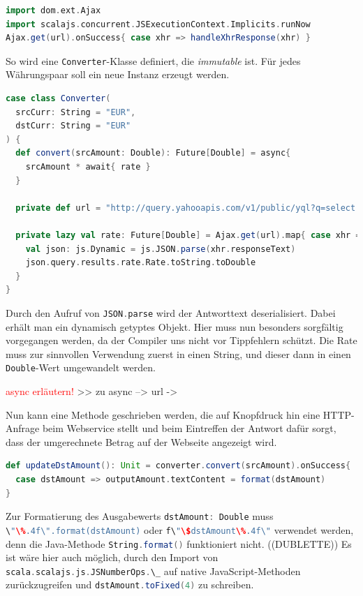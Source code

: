 \documentclass[a4paper, 12pt, hidelinks, listof=totoc, listoftables=totoc, bibliography=totoc]{scrreprt}
\newcommand{\scala}[1]{\lstinline[language=Scala, style=inline]|#1|}
\newcommand{\TODO}[1]{\textcolor{red}{#1}\newline}
\begin{document}
\begin{lstlisting}[language=Scala, caption={Futures-basierter HTTP-Aufruf mit Scala.js-Bequemlichkeitsmethode.}]
import dom.ext.Ajax
import scalajs.concurrent.JSExecutionContext.Implicits.runNow
Ajax.get(url).onSuccess{ case xhr => handleXhrResponse(xhr) }
\end{lstlisting}

So wird eine \scala{Converter}-Klasse definiert, die \emph{immutable} ist. Für jedes Währungspaar soll ein neue Instanz erzeugt werden.

\begin{lstlisting}[language=Scala, caption={Der Währungsumrechner.}]
case class Converter(
  srcCurr: String = "EUR",
  dstCurr: String = "EUR"
) {
  def convert(srcAmount: Double): Future[Double] = async{
    srcAmount * await{ rate }
  }

  private def url = "http://query.yahooapis.com/v1/public/yql?q=select * from yahoo.finance.xchange where pair in ('" + srcCurr + dstCurr + "')&format=json&env=store://datatables.org/alltableswithkeys"

  private lazy val rate: Future[Double] = Ajax.get(url).map{ case xhr =>
    val json: js.Dynamic = js.JSON.parse(xhr.responseText)
    json.query.results.rate.Rate.toString.toDouble
  }
}
\end{lstlisting}

Durch den Aufruf von \scala{JSON.parse} wird der Antworttext deserialisiert. Dabei erhält man ein dynamisch getyptes Objekt. Hier muss nun besonders sorgfältig vorgegangen werden, da der Compiler uns nicht vor Tippfehlern schützt. Die Rate muss zur sinnvollen Verwendung zuerst in einen String, und dieser dann in einen \scala{Double}-Wert umgewandelt werden.

\TODO{async erläutern!}
>> zu async --> url -> %

Nun kann eine Methode geschrieben werden, die auf Knopfdruck hin eine HTTP-Anfrage beim Webservice stellt und beim Eintreffen der Antwort dafür sorgt, dass der umgerechnete Betrag auf der Webseite angezeigt wird.

\begin{lstlisting}[language=Scala, style=snippet]
def updateDstAmount(): Unit = converter.convert(srcAmount).onSuccess{
  case dstAmount => outputAmount.textContent = format(dstAmount)
}
\end{lstlisting}

Zur Formatierung des Ausgabewerts \scala{dstAmount: Double} muss \scala{\"\%.4f\".format(dstAmount)} oder \scala{f\"\$dstAmount\%.4f\"} verwendet werden, denn die Java-Methode \scala{String.format()} funktioniert nicht. ((DUBLETTE)) Es ist wäre hier auch möglich, durch den Import von \scala{scala.scalajs.js.JSNumberOps.\_}
auf native JavaScript-Methoden zurückzugreifen und \scala{dstAmount.toFixed(4)} zu schreiben.
\end{document}
